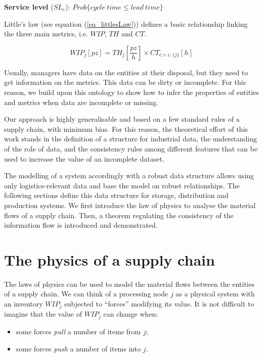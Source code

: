 \textbf{Service level} ($SL_e$): $Prob\{cycle\ time\le lead\ time\}$

Little’s law (see equation (\ref{eq_littlesLaw})) defines a basic relationship linking the three main metrics, i.e. $WIP$, $TH$ and $CT$.

\begin{equation}
WIP_j [pz]=TH_j \left[\frac{pz}{h}\right] \times CT_{e:e \in \{j\} } [h]
\label{eq_littlesLaw}
\end{equation}

Usually, managers have data on the entities at their disposal, but they need to get information on the metrics. This data can be dirty or incomplete. For this reason, we build upon this ontology to show how to infer the properties of entities and metrics when data are incomplete or missing.\par

Our approach is highly generalisable and based on a few standard rules of a supply chain, with minimum bias. For this reason, the theoretical effort of this work stands in the definition of a structure for industrial data, the understanding of the role of data, and the consistency rules among different features that can be used to increase the value of an incomplete dataset.\par

The modelling of a system accordingly with a robust data structure allows using only logistics-relevant data and base the model on robust relationships. The following sections define this data structure for storage, distribution and production systems. We first introduce the law of physics to analyse the material flows of a supply chain. Then, a theorem regulating the consistency of the information flow is introduced and demonstrated.\par


\section{The physics of a supply chain} \label{sect_supplyChainPhysics}

The laws of physics can be used to model the material flows between the entities of a supply chain. We can think of a processing node $j$ as a physical system with an inventory $WIP_j$ subjected to “forces” modifying its value. It is not difficult to imagine that the value of $WIP_j$ can change when:
\begin{itemize}
    \item some forces \textit{pull} a number of items from $j$;
    \item 	some forces \textit{push} a number of items into $j$.
\end{itemize}

